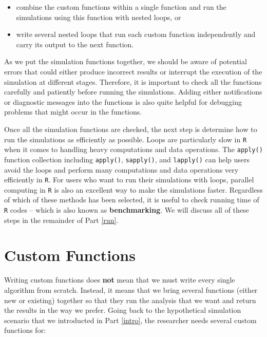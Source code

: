 \documentclass[
]{book}
\providecommand{\tightlist}{%
  \setlength{\itemsep}{0pt}\setlength{\parskip}{0pt}}
\begin{document}
\begin{itemize}
\tightlist
\item
  combine the custom functions within a single function and run the simulations using this function with nested loops, or
\item
  write several nested loops that run each custom function independently and carry its output to the next function.
\end{itemize}

As we put the simulation functions together, we should be aware of potential errors that could either produce incorrect results or interrupt the execution of the simulation at different stages. Therefore, it is important to check all the functions carefully and patiently before running the simulations. Adding either notifications or diagnostic messages into the functions is also quite helpful for debugging problems that might occur in the functions.

Once all the simulation functions are checked, the next step is determine how to run the simulations as efficiently as possible. Loops are particularly slow in \texttt{R} when it comes to handling heavy computations and data operations. The \texttt{apply()} function collection including \texttt{apply()}, \texttt{sapply()}, and \texttt{lapply()} can help users avoid the loops and perform many computations and data operations very efficiently in \texttt{R}. For users who want to run their simulations with loops, parallel computing in \texttt{R} is also an excellent way to make the simulations faster. Regardless of which of these methods has been selected, it is useful to check running time of \texttt{R} codes -- which is also known as \textbf{benchmarking}. We will discuss all of these steps in the remainder of Part \ref{run}.

\hypertarget{custom-functions}{%
\section{Custom Functions}\label{custom-functions}}

Writing custom functions does \textbf{not} mean that we must write every single algorithm from scratch. Instead, it means that we bring several functions (either new or existing) together so that they run the analysis that we want and return the results in the way we prefer. Going back to the hypothetical simulation scenario that we introducted in Part \ref{intro}, the researcher needs several custom functions for:
\end{document}
